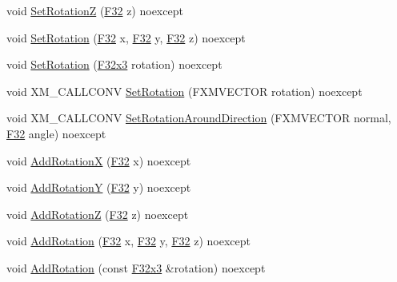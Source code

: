\begin{DoxyCompactItemize}
\item 
void \mbox{\hyperlink{classmage_1_1_local_transform_a1dcec183b2f7ebf3fc7eb4ab574ca045}{Set\+RotationZ}} (\mbox{\hyperlink{namespacemage_aa97e833b45f06d60a0a9c4fc22ae02c0}{F32}} z) noexcept
\item 
void \mbox{\hyperlink{classmage_1_1_local_transform_a7f6fbefa501a2111a07d532a823fba6e}{Set\+Rotation}} (\mbox{\hyperlink{namespacemage_aa97e833b45f06d60a0a9c4fc22ae02c0}{F32}} x, \mbox{\hyperlink{namespacemage_aa97e833b45f06d60a0a9c4fc22ae02c0}{F32}} y, \mbox{\hyperlink{namespacemage_aa97e833b45f06d60a0a9c4fc22ae02c0}{F32}} z) noexcept
\item 
void \mbox{\hyperlink{classmage_1_1_local_transform_aad6d2bf0eba13e47e90023edcdc55c47}{Set\+Rotation}} (\mbox{\hyperlink{namespacemage_a1e3c7a882af461f161caa1cbddaf1fa2}{F32x3}} rotation) noexcept
\item 
void X\+M\+\_\+\+C\+A\+L\+L\+C\+O\+NV \mbox{\hyperlink{classmage_1_1_local_transform_a470961f6e4f3b0920742489722ca791e}{Set\+Rotation}} (F\+X\+M\+V\+E\+C\+T\+OR rotation) noexcept
\item 
void X\+M\+\_\+\+C\+A\+L\+L\+C\+O\+NV \mbox{\hyperlink{classmage_1_1_local_transform_a366b1cbd069bce035a868a8800dc04e9}{Set\+Rotation\+Around\+Direction}} (F\+X\+M\+V\+E\+C\+T\+OR normal, \mbox{\hyperlink{namespacemage_aa97e833b45f06d60a0a9c4fc22ae02c0}{F32}} angle) noexcept
\item 
void \mbox{\hyperlink{classmage_1_1_local_transform_ab9d98b568a7384896857e2d6e72342db}{Add\+RotationX}} (\mbox{\hyperlink{namespacemage_aa97e833b45f06d60a0a9c4fc22ae02c0}{F32}} x) noexcept
\item 
void \mbox{\hyperlink{classmage_1_1_local_transform_adea3848a1d4d83a836d33668f323bb4d}{Add\+RotationY}} (\mbox{\hyperlink{namespacemage_aa97e833b45f06d60a0a9c4fc22ae02c0}{F32}} y) noexcept
\item 
void \mbox{\hyperlink{classmage_1_1_local_transform_ac769e25872e8a738bd6189f2ca6db4ea}{Add\+RotationZ}} (\mbox{\hyperlink{namespacemage_aa97e833b45f06d60a0a9c4fc22ae02c0}{F32}} z) noexcept
\item 
void \mbox{\hyperlink{classmage_1_1_local_transform_af4f3c10c99796ed8b71841bfd94e578d}{Add\+Rotation}} (\mbox{\hyperlink{namespacemage_aa97e833b45f06d60a0a9c4fc22ae02c0}{F32}} x, \mbox{\hyperlink{namespacemage_aa97e833b45f06d60a0a9c4fc22ae02c0}{F32}} y, \mbox{\hyperlink{namespacemage_aa97e833b45f06d60a0a9c4fc22ae02c0}{F32}} z) noexcept
\item 
void \mbox{\hyperlink{classmage_1_1_local_transform_a388e221978d1d8fb384ca1728301d4ab}{Add\+Rotation}} (const \mbox{\hyperlink{namespacemage_a1e3c7a882af461f161caa1cbddaf1fa2}{F32x3}} \&rotation) noexcept

\end{DoxyCompactItemize}
